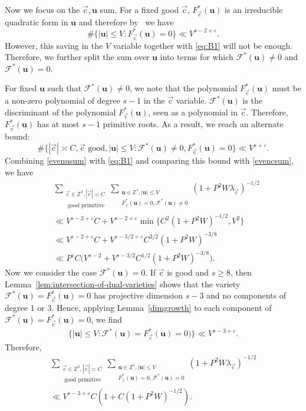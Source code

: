 \documentclass[letterpaper,11pt]{amsart}
\numberwithin{equation}{section}
\theoremstyle{definition}
\numberwithin{equation}{section}
\newcommand{\Z}{\mathbb{Z}}
\newcommand{\ZZ}{\mathbb{Z}}
\newcommand{\uu}{\mathbf{u}}
\newcommand{\uc}{{\vec{\mathrm{c}}}}
\def\scrF{{\mathcal F}}
\newcommand{\ve}{\varepsilon}
\begin{document}
Now we focus on the $\uc, \uu$ sum. For a fixed good $\uc$, $F^*_\uc(\uu)$ is an irreducible quadratic form in $\uu$ and therefore by~\cite[Theorem~2]{HeathBrown02} we have
\begin{equation}\label{evenusum}
\#\{|\uu|\leq V:F_\uc^*(\uu)=0\}\ll  V^{s-2+\ve}.
\end{equation}
However, this saving in the $V$ variable together with \eqref{eq:B1} will not be enough. Therefore, we further split the sum over $\uu$ into terms for which $\scrF^*(\uu)\neq 0 $ and $\scrF^*(\uu)=0$.

For fixed $\uu$ such that $\scrF^*(\uu)\neq 0$, we note that the polynomial $F^*_\uc(\uu)$ must be a non-zero polynomial of degree $s-1$ in the $\uc$ variable. $\scrF^*(\uu)$ is the discriminant of the polynomial $F^*_\uc(\uu)$, seen as a polynomial in $\uc$.   Therefore,  $F^*_\uc(\uu)$  has at most $s-1$ primitive roots. As a result, we reach an alternate bound:
\begin{equation}\label{evencsum}
\#\{|\uc|\asymp C, \uc \text{ good},  |\uu|\leq V: \scrF^*(\uu)\neq 0,F_\uc^*(\uu)=0\}\ll V^{s+\ve}. 
\end{equation}
Combining \eqref{evenusum} with \eqref{eq:B1} and comparing this bound with \eqref{evencsum}, we have 
\begin{align}\nonumber	 
&\sum_{\substack{ \uc\in\ZZ^2, |\uc| \asymp C\\ \textrm{ good primitive}}}	\sum_{\substack{\uu\in \Z^s, |\uu|\leq V\\ F_\uc^*(\uu)= 0, \scrF^*(\uu)\neq 0}}(1+P^2W\lambda_\uc)^{-1/2}\\
\nonumber
&\ll V^{s-2+\ve}C+V^{s-2+\ve}\min\{ C^2(1+P^2W)^{-1/2},V^2\}\\
\nonumber
&\ll V^{s-2+\ve}C+V^{s-3/2+\ve}C^{3/2}(1+P^2W)^{-3/8}\\
&\ll P^{\ve} C \Big(V^{s-2}+V^{s-3/2}C^{1/2}(1+P^2W)^{-3/8}\Big).\label{eq:105}
\end{align}
Now we consider the case $\mathcal F^*(\uu)=0$. 
If \(\uc\) is good and \(s\geq 8\), then Lemma~\ref{lem:intersection-of-dual-varieties} shows that the variety  $\scrF^*(\uu)=F_\uc^*(\uu)=0$ has projective dimension \(s-3\) and no components of degree 1 or 3. Hence, applying Lemma~\ref{dimgrowth} to each component of $\scrF^*(\uu)=F_\uc^*(\uu)=0$, we find
\begin{align*}
\{|\uu|\leq V:\scrF^*(\uu)=F^*_\uc(\uu)=0 )\}\ll  V^{s-3+\ve}.
\end{align*}
Therefore,  
\begin{multline}\label{eq:104}
\sum_{\substack{ \uc\in\ZZ^2 , |\uc| \asymp C\\ \textrm{ good primitive}}}		 \sum_{\substack{\uu\in \Z^s, |\uu|\leq V\\ F_\uc^*(\uu)= 0, \scrF^*(\uu)= 0}}(1+P^2W\lambda_\uc)^{-1/2}\\ \ll  V^{s-3+\ve}C(1+C(1+P^2W)^{-1/2}).
\end{multline}
\end{document}
